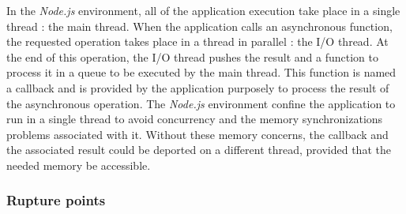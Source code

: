 In the \textit{Node.js} environment, all of the application execution take place in a single thread : the main thread.
When the application calls an asynchronous function, the requested operation takes place in a thread in parallel : the I/O thread.
At the end of this operation, the I/O thread pushes the result and a function to process it in a queue to be executed by the main thread.
This function is named a callback and is provided by the application purposely to process the result of the asynchronous operation.
The \textit{Node.js} environment confine the application to run in a single thread to avoid concurrency and the memory synchronizations problems associated with it.
Without these memory concerns, the callback and the associated result could be deported on a different thread, provided that the needed memory be accessible.

 

\subsubsection{Rupture points}

